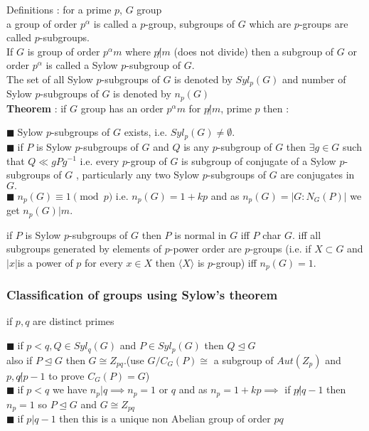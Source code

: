 \documentclass[11pt]{extarticle}
\newcommand{\y}{$\blacksquare\;$}
\newcommand{\tbx}[2][]{
	\begin{tcolorbox}[enhanced,breakable,size=small,colback=black!2!white,title={#1},arc is angular, arc=1.5mm,drop fuzzy shadow]
		#2
	\end{tcolorbox}
}
\begin{document}
\begin{multicols}{2}
{		
	}
	\tbx[\textbf{SYLOW'S Theorem} ]{
		{ Definitions :  for a prime $ p $, $ G $ group\\
			a group of order $ p^\alpha $ is called a $p $-group, subgroups of $ G $ which are $ p $-groups are called 
			$ p $-subgroups.\\
			If $ G $ is group of order $ p^\alpha m $ where $ p \not| m $ (does not divide) then a subgroup of $ G $ or order $ p^\alpha $ is called a Sylow $ p $-subgroup of $ G. $\\
			The set of all Sylow $ p $-subgroups of $ G $ is denoted by $ Syl_p(G) $ and number of  Sylow $ p $-subgroups of $ G $ is denoted by $ n_p(G) $}\\
		\textbf{Theorem} : if $ G $ group has an order $ p^\alpha m $ for $ p\not| m $, prime $ p $ then :
		
			\y  Sylow $ p $-subgroups of $ G $ exists, i.e. $ Syl_p(G)\neq \emptyset $. \\
			\y  if $ P $ is Sylow $ p $-subgroups of $ G $ and $ Q $ is any $ p $-subgroup of $ G $ then $ \exists g \in G $ such that $ Q\ll gPg^{-1} $ i.e. every $ p $-group of $ G $ is subgroup of conjugate of  a Sylow $ p $-subgroups of $ G $ , particularly any two Sylow $ p $-subgroups of $ G $ are conjugates in $ G. $ \\
			\y  $ n_p(G)\equiv 1 \pmod{p} $ i.e. $ n_p(G)=1+kp $ and as $ n_p(G)=|G:N_G(P)| $ we get $ n_p(G) | m .$ }
		
	\tbx[Consequences of of Sylow's Theorem ]{
		if $ P $ is Sylow $ p $-subgroups of $ G $ then $P$ is normal in $ G $ iff $ P $ char $ G .$ iff all subgroups generated by 
		elements of $ p $-power order are $ p $-groups  (i.e. if $ X\subset G $ and $ |x| $is a power of $ p $ for every 
		$ x\in X $ then $ \langle X \rangle $ is $ p $-group) iff $ n_p(G)=1. $}
	
	\subsubsection{ Classification of groups using Sylow's theorem}
	 if $ p,q $ are distinct primes
	\tbx[group $ G $ of order $ pq $ ]{
		
			\y   if $ p<q , Q\in Syl_q(G)$ and $ P\in Syl_p(G) $  then $ Q\trianglelefteq G $ \\ 
			also if $ P\trianglelefteq G $ then $ G\cong Z_{pq}.$(use $ G/C_G(P) \cong $ a subgroup of $ Aut(Z_p) $ and $ p,q\not| p-1 $ to prove $ C_G(P)=G $)	\\
			\y  if $ p<q $ we have $ n_p|q  \implies n_p=1 $ or $ q $  and as $ n_p=1+kp \implies $ if $ p\not| q-1 $ then $ n_p=1 $ so $ P\trianglelefteq G $ and $ G \cong Z_{pq} $  \\
			\y  if $ p|q-1 $ then this is a unique non Abelian group of order $ pq $ }
		

\end{multicols}
\end{document}
